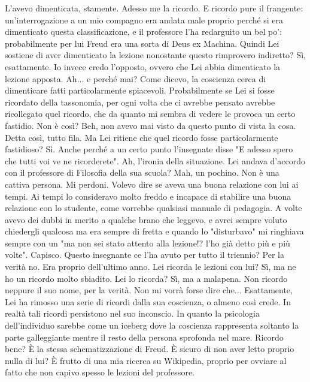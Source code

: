\documentclass[a4paper,12pt]{article}
\newcommand{\Walter}{\speak{W}}
\newcommand{\Pollazzi}{\speak{P}}
\begin{document}
\begin{dialogue}
\Walter L'avevo dimenticata, stamente. Adesso me la ricordo. E ricordo pure il frangente: un'interrogazione a un mio compagno era andata male proprio perché si era dimenticato questa classificazione, e il professore l'ha redarguito un bel po': probabilmente per lui Freud era una sorta di Deus ex Machina.
\Pollazzi Quindi Lei sostiene di aver dimenticato la lezione nonostante questo rimprovero indiretto?
\Walter Sì, esattamente.
\Pollazzi Io invece credo l'opposto, ovvero che Lei abbia dimenticato la lezione apposta.
\Walter Ah... e perché mai?
\Pollazzi Come dicevo, la coscienza cerca di dimenticare fatti particolarmente spiacevoli. Probabilmente se Lei si fosse ricordato della tassonomia, per ogni volta che ci avrebbe pensato avrebbe ricollegato quel ricordo, che da quanto mi sembra di vedere le provoca un certo fastidio. Non è così?
\Walter Beh, non avevo mai visto da questo punto di vista la cosa. Detta così, tutto fila.
\Pollazzi Ma Lei ritiene che quel ricordo fosse particolarmente fastidioso?
\Walter Sì. Anche perché a un certo punto l'insegnate disse "E adesso spero che tutti voi ve ne ricorderete". Ah, l'ironia della situazione.
\Pollazzi Lei andava d'accordo con il professore di Filosofia della sua scuola?
\Walter Mah, un pochino. Non è una cattiva persona.
\Pollazzi Mi perdoni. Volevo dire se aveva una buona relazione con lui ai tempi.
\Walter Ai tempi lo consideravo molto freddo e incapace di stabilire una buona relazione con lo studente, come vorrebbe qualsiasi manuale di pedagogia. A volte avevo dei dubbi in merito a qualche brano che leggevo, e avrei sempre voluto chiedergli qualcosa ma era sempre di fretta e quando lo "disturbavo" mi ringhiava sempre con un "ma non sei stato attento alla lezione!? l'ho già detto più e più volte".
\Pollazzi Capisco. Questo insegnante ce l'ha avuto per tutto il triennio?
\Walter Per la verità no. Era proprio dell'ultimo anno.
\Pollazzi Lei ricorda le lezioni con lui?
\Walter Sì, ma ne ho un ricordo molto sbiadito.
\Pollazzi Lei lo ricorda?
\Walter Sì, ma a malapena. Non ricordo neppure il suo nome, per la verità. Non mi vorrà forse dire che...
\Pollazzi Esattamente, Lei ha rimosso una serie di ricordi dalla sua coscienza,
o almeno così crede. In realtà tali ricordi persistono nel suo inconscio.
\Walter In quanto la psicologia dell’individuo sarebbe come un iceberg dove la coscienza rappresenta soltanto la parte galleggiante mentre il resto della persona sprofonda nel mare. Ricordo bene?
\Pollazzi È la stessa schematizzazione di Freud. È sicuro di non aver letto proprio nulla di lui?
\Walter È frutto di una mia ricerca su Wikipedia, proprio per ovviare al fatto che non capivo spesso le lezioni del professore.

\end{dialogue}
\end{document}
